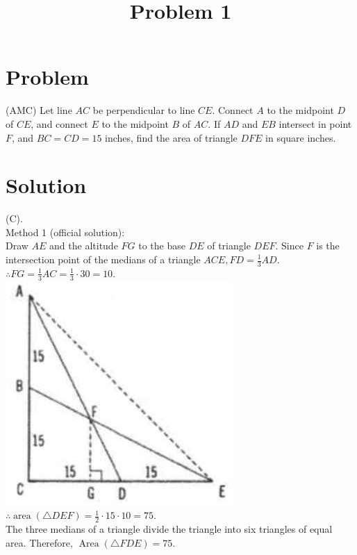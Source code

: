 \documentclass{article}
\title{Problem 1}
\date{}
\begin{document}
\maketitle

\section*{Problem}
(AMC) Let line \(A C\) be perpendicular to line \(C E\). Connect \(A\) to the midpoint \(D\) of \(C E\), and connect \(E\) to the midpoint \(B\) of \(A C\). If \(A D\) and \(E B\) intersect in point \(F\), and \(B C=C D=15\) inches, find the area of triangle \(D F E\) in square inches.

\section*{Solution}
(C).\\
Method 1 (official solution):\\
Draw \(A E\) and the altitude \(F G\) to the base \(D E\) of triangle \(D E F\). Since \(F\) is the intersection point of the medians of a triangle \(A C E, F D=\frac{1}{3} A D\).\\
\(\therefore F G=\frac{1}{3} A C=\frac{1}{3} \cdot 30=10\).\\
\centering
\includegraphics[width=\textwidth]{images/problem_image_1.jpg}\\
\(\therefore \operatorname{area}(\triangle D E F)=\frac{1}{2} \cdot 15 \cdot 10=75\).\\
The three medians of a triangle divide the triangle into six triangles of equal area. Therefore, \(\operatorname{Area}(\triangle F D E)=75\).
\end{document}
